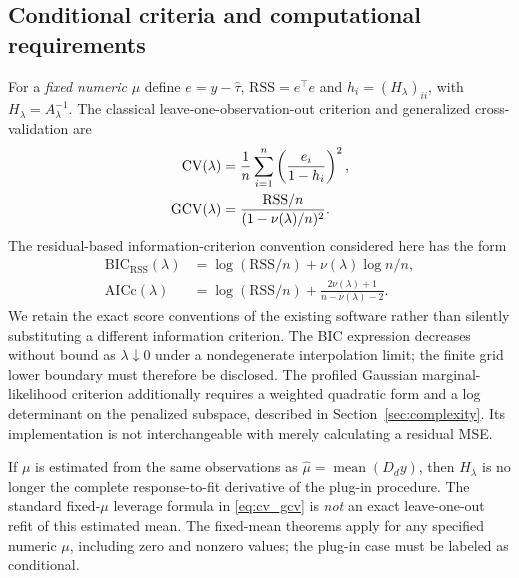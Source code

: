 \subsection{Conditional criteria and computational requirements}
For a \emph{fixed numeric} $\mu$ define $e=y-\widehat\tau$, $\mathrm{RSS}=e^\top e$ and $h_i=(H_\lambda)_{ii}$, with $H_\lambda=A_\lambda^{-1}$. The classical leave-one-observation-out criterion and generalized cross-validation are
\begin{equation}\label{eq:cv_gcv}
\begin{aligned}
\operatorname{CV}(\lambda)&=\frac{1}{n}\sum_{i=1}^n
\left(\frac{e_i}{1-h_i}\right)^2,\\
\operatorname{GCV}(\lambda)&=\frac{\mathrm{RSS}/n}
{(1-\nu(\lambda)/n)^2}.
\end{aligned}
\end{equation}
The residual-based information-criterion convention considered here has the form
\begin{equation}\label{eq:information}
\begin{aligned}
\mathrm{BIC}_{\mathrm{RSS}}(\lambda)
 &=\log(\mathrm{RSS}/n)+\nu(\lambda)\log n/n,\\
\mathrm{AICc}(\lambda)
 &=\log(\mathrm{RSS}/n)
 +\frac{2\nu(\lambda)+1}{n-\nu(\lambda)-2}.
\end{aligned}
\end{equation}
We retain the exact score conventions of the existing software rather than silently substituting a different information criterion. The BIC expression decreases without bound as $\lambda\downarrow0$ under a nondegenerate interpolation limit; the finite grid lower boundary must therefore be disclosed. The profiled Gaussian marginal-likelihood criterion additionally requires a weighted quadratic form and a log determinant on the penalized subspace, described in Section~\ref{sec:complexity}. Its implementation is not interchangeable with merely calculating a residual MSE.

If $\mu$ is estimated from the same observations as $\widehat\mu=\operatorname{mean}(D_dy)$, then $H_\lambda$ is no longer the complete response-to-fit derivative of the plug-in procedure. The standard fixed-$\mu$ leverage formula in \eqref{eq:cv_gcv} is \emph{not} an exact leave-one-out refit of this estimated mean. The fixed-mean theorems apply for any specified numeric $\mu$, including zero and nonzero values; the plug-in case must be labeled as conditional.

